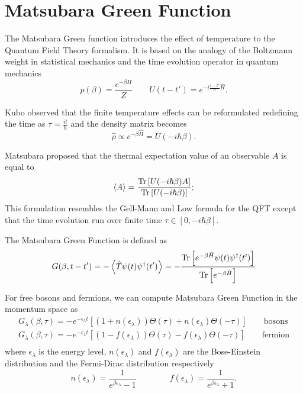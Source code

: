 \chapter{Matsubara Green Function} \label{Appendix_B}

The Matsubara Green function introduces the effect of temperature to the Quantum Field Theory formalism.
It is based on the analogy of the Boltzmann weight in statistical mechanics and the time evolution operator in quantum mechanics 
\begin{equation}
    p(\beta) = \frac{e^{-\beta H}}{Z} \qquad U(t-t') = e^{-i\frac{t-t'}{\hbar}\hat H} .
\end{equation}

Kubo observed that the finite temperature effects can be reformulated redefining the time as $\tau = \frac{it}{\hbar}$ and the density matrix becomes \cite{Coleman_2015}
\begin{equation}
    \hat \rho \propto e^{-\beta \hat H} = U(-i\hbar \beta).
\end{equation}

Matsubara proposed that the thermal expectation value of an observable $A$ is equal to  
\begin{equation}
    \left<A\right> = \frac{\operatorname{Tr} \left[U(-i\hbar \beta)A\right]}{\operatorname{Tr}\left[U(-i\hbar \beta)\right]};
\end{equation}
This formulation resembles the Gell-Mann and Low formula for the QFT except that the time evolution run over finite time $\tau \in \left[0,-i\hbar\beta\right]$\cite{Coleman_2015}.

The Matsubara Green Function is defined as 
\begin{equation}
    G(\beta, t-t') = - \left< \hat T \psi(t)\psi^\dagger(t') \right> = -\frac{\operatorname{Tr}\left[e^{-\beta\hat H} \psi(t)\psi^\dagger(t') \right]}{\operatorname{Tr}\left[e^{-\beta\hat H}\right]}
\end{equation}

For free bosons and fermions, we can compute Matsubara Green Function in the momentum space as \cite{Coleman_2015}
\begin{equation}
    \begin{split}
        G_{\lambda}(\beta, \tau) = -e^{-\epsilon_\lambda t}\left[(1+n(\epsilon_\lambda))\Theta(\tau)+n(\epsilon_\lambda)\Theta(-\tau)\right] \qquad \mathrm{bosons}\\
        G_{\lambda}(\beta, \tau) = -e^{-\epsilon_\lambda t}\left[(1-f(\epsilon_\lambda))\Theta(\tau)-f(\epsilon_\lambda)\Theta(-\tau)\right] \qquad \mathrm{fermion}\\
    \end{split}
\end{equation}
where $\epsilon_\lambda$ is the energy level, $n(\epsilon_\lambda)$ and $f(\epsilon_\lambda)$ are the Bose-Einstein distribution and the Fermi-Dirac distribution respectively
\begin{equation}
    n(\epsilon_\lambda) = \frac{1}{e^{\beta\epsilon_\lambda} - 1} \qquad\qquad f(\epsilon_\lambda) = \frac{1}{e^{\beta\epsilon_\lambda} + 1}.
\end{equation}

